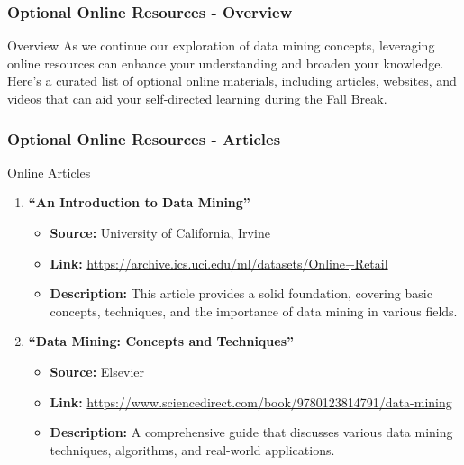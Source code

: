 \documentclass[aspectratio=169]{beamer}
\begin{document}
\begin{frame}[fragile]
\frametitle{Optional Online Resources - Overview}
\begin{block}{Overview}
As we continue our exploration of data mining concepts, leveraging online resources can enhance your understanding and broaden your knowledge. Here’s a curated list of optional online materials, including articles, websites, and videos that can aid your self-directed learning during the Fall Break.
\end{block}
\end{frame}

\begin{frame}[fragile]
\frametitle{Optional Online Resources - Articles}
\begin{block}{Online Articles}
\begin{enumerate}
    \item \textbf{“An Introduction to Data Mining”}
    \begin{itemize}
        \item \textbf{Source:} University of California, Irvine
        \item \textbf{Link:} \url{https://archive.ics.uci.edu/ml/datasets/Online+Retail}
        \item \textbf{Description:} This article provides a solid foundation, covering basic concepts, techniques, and the importance of data mining in various fields.
    \end{itemize}

    \item \textbf{“Data Mining: Concepts and Techniques”}
    \begin{itemize}
        \item \textbf{Source:} Elsevier
        \item \textbf{Link:} \url{https://www.sciencedirect.com/book/9780123814791/data-mining}
        \item \textbf{Description:} A comprehensive guide that discusses various data mining techniques, algorithms, and real-world applications.
    \end{itemize}
\end{enumerate}
\end{block}
\end{frame}
\end{document}
